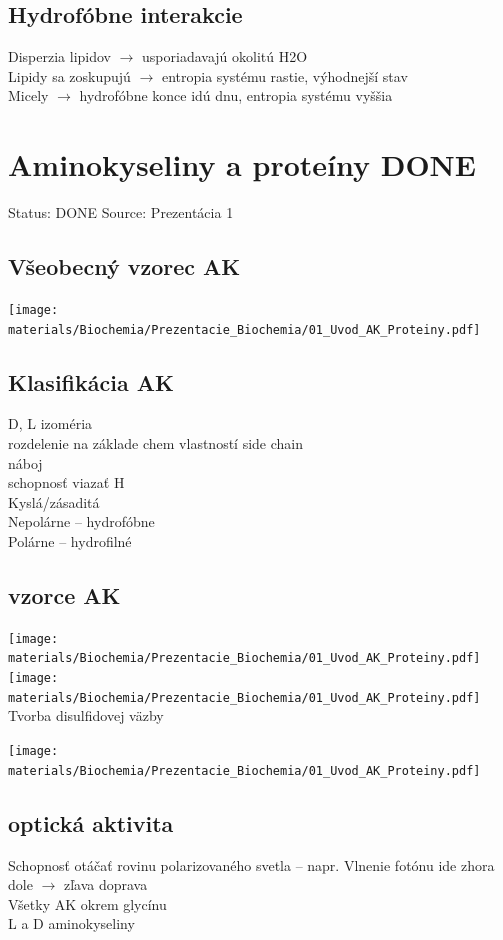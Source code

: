 \subsection{Hydrofóbne interakcie}
Disperzia lipidov $\rightarrow$ usporiadavajú okolitú H2O\\
Lipidy sa zoskupujú $\rightarrow$ entropia systému rastie, výhodnejší stav\\
Micely $\rightarrow$ hydrofóbne konce idú dnu, entropia systému vyššia\\

\section{Aminokyseliny a proteíny DONE}

Status: DONE
Source: Prezentácia 1
\\
\subsection{Všeobecný vzorec AK}
\texttt{[image: materials/Biochemia/Prezentacie\_Biochemia/01\_Uvod\_AK\_Proteiny.pdf]}
\subsection{Klasifikácia AK}
D, L izoméria\\
rozdelenie na základe chem vlastností side chain\\
\tab náboj\\
\tab schopnosť viazať H\\
\tab Kyslá/zásaditá\\
Nepolárne -- hydrofóbne\\
Polárne -- hydrofilné
\subsection{vzorce AK}
\texttt{[image: materials/Biochemia/Prezentacie\_Biochemia/01\_Uvod\_AK\_Proteiny.pdf]}
\texttt{[image: materials/Biochemia/Prezentacie\_Biochemia/01\_Uvod\_AK\_Proteiny.pdf]}
\\
Tvorba disulfidovej väzby

\texttt{[image: materials/Biochemia/Prezentacie\_Biochemia/01\_Uvod\_AK\_Proteiny.pdf]}
\\
\subsection{optická aktivita}
Schopnosť otáčať rovinu polarizovaného svetla -- napr. Vlnenie fotónu ide zhora dole $\rightarrow$ zľava doprava\\
Všetky AK okrem glycínu\\
L a D aminokyseliny \\

